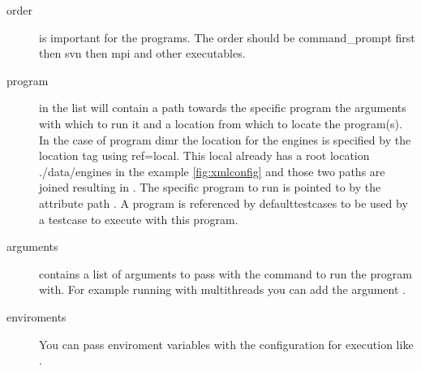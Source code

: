 \documentclass{deltares_memo}
\begin{document}
\begin{description}
\item[order] is important for the programs. The order should be command\_prompt first then svn then mpi and other executables.
\item[program] in the list will contain a path towards the specific program the arguments with which to run it and a location from which to locate the program(s).
In the case of program dimr the location for the engines is  specified by the location tag using ref=local. This local already has a root location ./data/engines in the example \autoref{fig:xmlconfig} and those two paths are joined resulting in . The specific program to run is pointed to by the attribute path . A program is referenced by defaulttestcases to be used by a testcase to execute with this program.
\item[arguments] contains a list of arguments to pass with the command to run the program with. For example running  with multithreads you can add the argument \newline{}.
\item[enviroments] You can pass enviroment variables with the configuration for execution like .
\end{description}
\end{document}
